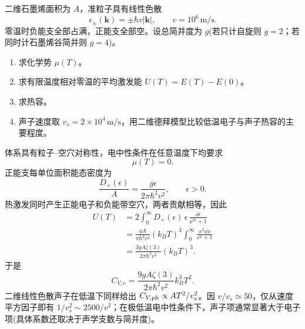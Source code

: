 \begin{question}[15 分]
二维石墨烯面积为 $A$，准粒子具有线性色散
\[\epsilon_{\pm}(\bm k)=\pm\hbar v|\bm k|,\qquad v=10^6\,\mathrm{m/s}.\]
零温时负能支全部占满，正能支全部空。设总简并度为 $g$(若只计自旋则 $g=2$；若同时计石墨烯谷简并则 $g=4$)。
\begin{enumerate}
  \item 求化学势 $\mu(T)$。
  \item 求有限温度相对零温的平均激发能 $U(T)=E(T)-E(0)$。
  \item 求热容。
  \item 声子速度取 $v_s=2\times10^4\,\mathrm{m/s}$，用二维德拜模型比较低温电子与声子热容的主要程度。
\end{enumerate}
\begin{solution}
体系具有粒子--空穴对称性，电中性条件在任意温度下均要求
\[\boxed{\mu(T)=0}.\]
正能支每单位面积能态密度为
\[\frac{D_+(\epsilon)}{A}=\frac{g\epsilon}{2\pi\hbar^2v^2},\qquad \epsilon>0.\]
热激发同时产生正能电子和负能带空穴，两者贡献相等，因此
\begin{align*}
U(T)&=2\int_0^\infty D_+(\epsilon)\,\epsilon\,\frac{\dd{\epsilon}}{\ee^{\beta\epsilon}+1}\\
&=\frac{gA}{\pi\hbar^2v^2}(k_BT)^3\int_0^\infty\frac{x^2\dd{x}}{\ee^x+1}\\
&=\boxed{\frac{3gA\zeta(3)}{2\pi\hbar^2v^2}(k_BT)^3}.
\end{align*}
于是
\[\boxed{C_{V,e}=\frac{9gA\zeta(3)}{2\pi\hbar^2v^2}k_B^3T^2}.\]
二维线性色散声子在低温下同样给出 $C_{V,\rm ph}\propto A T^2/v_s^2$。因 $v/v_s\simeq50$，仅从速度平方因子即有 $1/v_s^2\sim2500/v^2$；在极低温电中性条件下，声子项通常显著大于电子项(具体系数还取决于声学支数与简并度)。
\end{solution}
\end{question}

